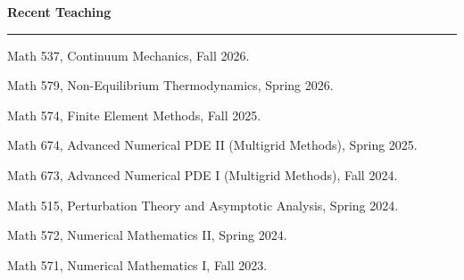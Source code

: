 \documentclass[10pt,letterpaper]{article}
\newcommand{\cvsection}[1]{%
  \Needspace{5\baselineskip}\par\vspace{13pt}%
  {\color{Smokey}\fontsize{15}{17}\selectfont\bfseries #1}\par\vspace{3pt}%
  {\color{UTOrange}\rule{\linewidth}{1.8pt}}\par\vspace{4pt}%
}
\begin{document}
	\cvsection{Recent Teaching}
    \begin{description}
    \item
Math 537, Continuum Mechanics, Fall 2026.
    \item
Math 579, Non-Equilibrium Thermodynamics, Spring 2026.
    \item
Math 574, Finite Element Methods, Fall 2025.
    \item
Math 674, Advanced Numerical PDE II (Multigrid Methods), Spring 2025.
    \item
Math 673, Advanced Numerical PDE I (Multigrid Methods), Fall 2024.
    \item
Math 515, Perturbation Theory and Asymptotic Analysis, Spring 2024.
    \item
Math 572, Numerical Mathematics II, Spring 2024.
    \item
Math 571, Numerical Mathematics I, Fall 2023.
	\end{description}
\end{document}
